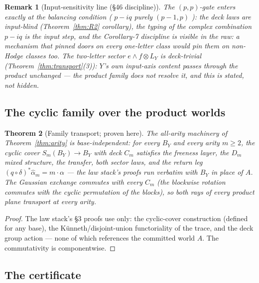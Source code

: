 \documentclass[11pt]{article}
\newcommand{\cyc}{C_m}
\newtheorem{theorem}{Theorem}[section]
\newtheorem{remark}[theorem]{Remark}
\begin{document}
\begin{remark}[Input-sensitivity line (§46 discipline)]
The $(p,p)$-gate enters \emph{exactly} at the balancing condition
( $p-iq$ purely $(p-1,p)$ ): the deck laws are input-blind
(Theorem~\ref{thm:R2} corollary), the typing of the complex combination
$p-iq$ is the input step, and the Corollary-7 discipline is visible in
the raw: a mechanism that pinned doors on \emph{every} one-letter class
would pin them on non-Hodge classes too. The two-letter sector
$e\wedge f\otimes L_Y$ is deck-trivial
(Theorem~\ref{thm:transport}(3)): $Y$'s own input-axis content passes
through the product \emph{unchanged} --- the product family does not
resolve it, and this is stated, not hidden.
\end{remark}

\subsection{The cyclic family over the product worlds}

\begin{theorem}[Family transport; proven here]\label{thm:family-transport}
The all-arity machinery of Theorem~\ref{thm:arity} is base-independent:
for every $B_Y$ and every arity $m\ge2$, the cyclic cover
$S_m(B_Y)\to B_Y$ with deck $\cyc$ satisfies the freeness layer, the
$D_m$ mixed structure, the transfer, both sector laws, and the return leg
$(q\circ\delta)^\ast\widehat{\alpha}_m=m\cdot\alpha$ --- the law stack's proofs
run verbatim with $B_Y$ in place of $A$. The Gaussian exchange commutes
with every $\cyc$ (the blockwise rotation commutes with the cyclic
permutation of the blocks), so both rays of every product plane transport
at every arity.
\end{theorem}

\begin{proof}
The law stack's §3 proofs use only: the cyclic-cover construction (defined
for any base), the Künneth/disjoint-union functoriality of the trace, and
the deck group action --- none of which references the committed world $A$.
The commutativity is componentwise.
\end{proof}

\subsection{The certificate}
\end{document}
